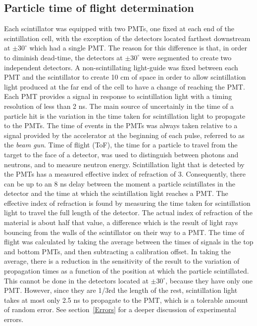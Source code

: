 \subsection{Particle time of flight determination}
\label{reconstruction}
Each scintillator was equipped with two PMTs, one fixed at each end of the scintillation cell, with the exception of the detectors located farthest downstream at $\pm30^{\circ}$ which had a single PMT.
The reason for this difference is that, in order to diminish dead-time, the detectors at $\pm30^{\circ}$ were segmented to create two independent detectors.
A non-scintillating light-guide was fixed between each PMT and the scintillator to create 10 cm of space in order to allow scintillation light produced at the far end of the cell to have a change of reaching the PMT.
Each PMT provides a signal in response to scintillation light with a timing resolution of less than 2 ns.
The main source of uncertainly in the time of a particle hit is the variation in the time taken for scintillation light to propagate to the PMTs.
The time of events in the PMTs was always taken relative to a signal provided by the accelerator at the beginning of each pulse, referred to as the \textit{beam gun}.
Time of flight (ToF), the time for a particle to travel from the target to the face of a detector, was used to distinguish between photons and neutrons, and to measure neutron energy.
Scintillation light that is detected by the PMTs has a measured effective index of refraction of 3.
Consequently, there can be up to an 8 ns delay between the moment a particle scintillates in the detector and the time at which the scintillation light reaches a PMT.
The effective index of refraction is found by measuring the time taken for scintillation light to travel the full length of the detector.
The actual index of refraction of the material is about half that value, a difference which is the result of light rays bouncing from the walls of the scintillator on their way to a PMT.
The time of flight was calculated by taking the average between the times of signals in the top and bottom PMTs, and then subtracting a calibration offset.
In taking the average, there is a reduction in the sensitivity of the result to the variation of propagation times as a function of the position at which the particle scintillated.
This cannot be done in the detectors located at $\pm30^{\circ}$, because they have only one PMT.
However, since they are 1/3rd the length of the rest, scintillation light takes at most only 2.5 ns to propagate to the PMT, which is a tolerable amount of random error.
See section~\ref{Errors} for a deeper discussion of experimental errors.

